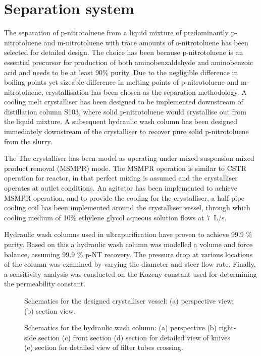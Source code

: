 \section*{Separation system}

The separation of p-nitrotoluene from a liquid mixture of predominantly p-nitrotoluene and m-nitrotoluene with trace amounts of o-nitrotoluene has been selected for detailed design. The choice has been because p-nitrotoluene is an essential precursor for production of both aminobenzaldehyde and aminobenzoic acid and needs to be at least 90\% purity. Due to the negligible difference in boiling points yet sizeable difference in melting points of p-nitrotoluene and m-nitrotoluene, crystallisation has been chosen as the separation methodology. A cooling melt crystalliser has been designed to be implemented downstream of distillation column S103, where solid p-nitrotoluene would crystallise out from the liquid mixture. A subsequent hydraulic wash column has been designed immediately downstream of the crystalliser to recover pure solid p-nitrotoluene from the slurry. 


The The crystalliser has been model as operating under mixed suspension mixed product removal (MSMPR) mode. The MSMPR operation is similar to CSTR operation for reactor, in that perfect mixing is assumed and the crystalliser operates at outlet conditions. An agitator has been implemented to achieve MSMPR operation, and to provide the cooling for the crystalliser, a half pipe cooling coil has been implemented around the crystalliser vessel, through which cooling medium of 10\% ethylene glycol aqueous solution flows at \SI{7}{L/s}. 


Hydraulic wash columns used in ultrapurification have proven to achieve 99.9 \% purity. Based on this a hydraulic wash column was modelled a volume and force balance, assuming 99.9 \% p-NT recovery. The pressure drop at various locations of the column was examined by varying the diameter and steer flow rate. Finally, a sensitivity analysis was conducted on the Kozeny constant used for determining the permeability constant. 

\begin{figure}[h]
    \centering
    
    \caption{Schematics for the designed crystalliser vessel: (a) perspective view; (b) section view.}
    \label{fig:crystalliser schematic executive}
\end{figure}

\begin{figure}[h]
    \centering
    
    \caption{Schematics for the hydraulic wash column: (a) perspective (b) right-side section (c) front section (d) section for detailed view of knives (e) section for detailed view of filter tubes crossing.}
    \label{fig:wash column schematic executive}
\end{figure}